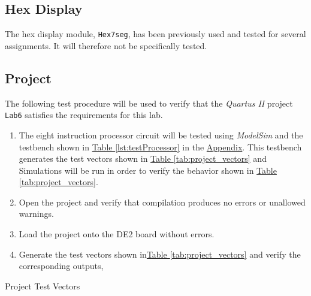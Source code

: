 
\subsection{Hex Display} %
\label{sub:hex_display}

The hex display module, \verb|Hex7seg|, has been previously used and tested for several assignments.
It will therefore not be specifically tested.

\subsection{Project} %
\label{sub:project}

The following test procedure will be used to verify that the \emph{Quartus II} project \verb|Lab6| satisfies the requirements for this lab.

\begin{enumerate}
    \item The eight instruction processor circuit will be tested using \emph{ModelSim} and the testbench shown in \hyperref[lst:testProcessor]{Table \ref*{lst:testProcessor}} in the \hyperref[sec:appendix]{Appendix}.
    This testbench generates the test vectors shown in \hyperref[tab:project_vectors]{Table \ref*{tab:project_vectors}}
    and %
    Simulations will be run in order to verify the behavior shown in
    \hyperref[tab:project_vectors]{Table \ref*{tab:project_vectors}}.
    \item Open the project and verify that compilation produces no errors or unallowed warnings.
    \item Load the project onto the DE2 board without errors.
    \item Generate the test vectors shown in\hyperref[tab:project_vectors]{Table \ref*{tab:project_vectors}}
    and verify the corresponding outputs,%
\end{enumerate}

\begin{table}[htbp]
    \centering
    \caption{Project Test Vectors\label{tab:project_vectors}}
\end{table}

